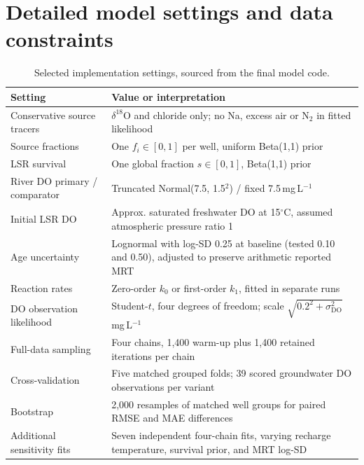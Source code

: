 \documentclass[11pt,a4paper]{article}
\newcommand{\DO}{\mathrm{DO}}
\begin{document}
\section{Detailed model settings and data constraints}
\begin{table}[htbp]
\centering\small
\caption{Selected implementation settings, sourced from the final model code.}
\begin{tabularx}{\linewidth}{>{\raggedright\arraybackslash}p{.37\linewidth}X}
\toprule
Setting & Value or interpretation\\
\midrule
Conservative source tracers & \(\delta^{18}\mathrm O\) and chloride only; no Na, excess air or N\(_2\) in fitted likelihood\\
Source fractions & One \(f_i\in[0,1]\) per well, uniform Beta(1,1) prior\\
LSR survival & One global fraction \(s\in[0,1]\), Beta(1,1) prior\\
River DO primary / comparator & Truncated Normal(7.5, 1.5\(^2\)) / fixed 7.5\,mg\,L\(^{-1}\)\\
Initial LSR DO & Approx. saturated freshwater DO at 15\(^\circ\)C, assumed atmospheric pressure ratio 1\\
Age uncertainty & Lognormal with log-SD 0.25 at baseline (tested 0.10 and 0.50), adjusted to preserve arithmetic reported MRT\\
Reaction rates & Zero-order \(k_0\) or first-order \(k_1\), fitted in separate runs\\
DO observation likelihood & Student-\(t\), four degrees of freedom; scale \(\sqrt{0.2^2+\sigma_{\DO}^2}\) mg\,L\(^{-1}\)\\
Full-data sampling & Four chains, 1,400 warm-up plus 1,400 retained iterations per chain\\
Cross-validation & Five matched grouped folds; 39 scored groundwater DO observations per variant\\
Bootstrap & 2,000 resamples of matched well groups for paired RMSE and MAE differences\\
Additional sensitivity fits & Seven independent four-chain fits, varying recharge temperature, survival prior, and MRT log-SD\\
\bottomrule
\end{tabularx}
\end{table}
\end{document}
